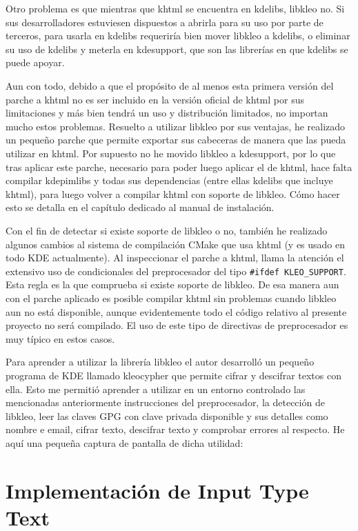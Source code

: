 Otro problema es que mientras que khtml se encuentra en kdelibs, libkleo no. Si sus desarrolladores estuviesen dispuestos a abrirla para su uso por parte de terceros, para usarla en kdelibs requeriría bien mover libkleo a kdelibs, o eliminar su uso de kdelibs y meterla en kdesupport, que son las librerías en que kdelibs se puede apoyar.

Aun con todo, debido a que el propósito de al menos esta primera versión del parche a khtml no es ser incluido en la versión oficial de khtml por sus limitaciones y más bien tendrá un uso y distribución limitados, no importan mucho estos problemas. Resuelto a utilizar libkleo por sus ventajas, he realizado un pequeño parche que permite exportar sus cabeceras de manera que las pueda utilizar en khtml. Por supuesto no he movido libkleo a kdesupport, por lo que tras aplicar este parche, necesario para poder luego aplicar el de khtml, hace falta compilar kdepimlibs y todas sus dependencias (entre ellas kdelibs que incluye khtml), para luego volver a compilar khtml con soporte de libkleo. Cómo hacer esto se detalla en el capítulo dedicado al manual de instalación.

Con el fin de detectar si existe soporte de libkleo o no, también he realizado algunos cambios al sistema de compilación CMake que usa khtml (y es usado en todo KDE actualmente). Al inspeccionar el parche a khtml, llama la atención el extensivo uso de condicionales del preprocesador del tipo \verb|#ifdef KLEO_SUPPORT|. Esta regla es la que comprueba si existe soporte de libkleo. De esa manera aun con el parche aplicado es posible compilar khtml sin problemas cuando libkleo aun no está disponible, aunque evidentemente todo el código relativo al presente proyecto no será compilado. El uso de este tipo de directivas de preprocesador es muy típico en estos casos.

Para aprender a utilizar la librería libkleo el autor desarrolló un pequeño programa de KDE llamado kleocypher que permite cifrar y descifrar textos con ella. Esto me permitió aprender a utilizar en un entorno controlado las mencionadas anteriormente instrucciones del preprocesador, la detección de libkleo, leer las claves GPG con clave privada disponible y sus detalles como nombre e email, cifrar texto, descifrar texto y comprobar errores al respecto. He aquí una pequeña captura de pantalla de dicha utilidad:


\section{Implementación de Input Type Text}\label{input}

